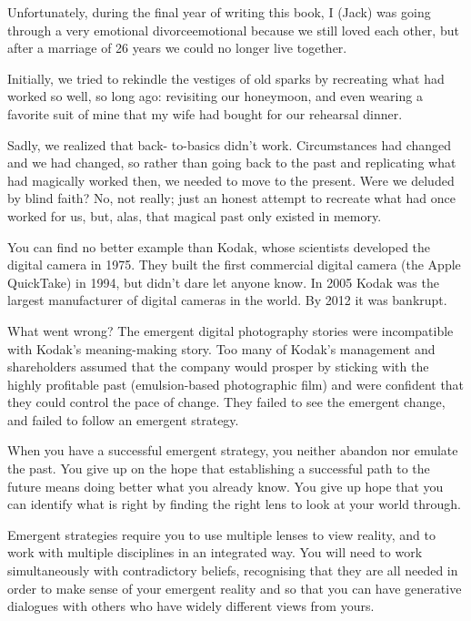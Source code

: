 \begin{longstoryblock}
Unfortunately, during the final year of writing this book, I (Jack) was going through a very emotional divorce\textemdash emotional because we still loved each other, but after a marriage of 26 years we could no longer live together. 


Initially, we tried to rekindle the vestiges of old sparks by recreating what had worked so well, so long ago: revisiting our honeymoon, and even wearing a favorite suit of mine that my wife had bought for our rehearsal dinner. 


Sadly, we realized that back- to-basics didn’t work. Circumstances had changed and we had changed, so rather than going back to the past and replicating what had magically worked then, we needed to move to the present. Were we deluded by blind faith? No, not really; just an honest attempt to recreate what had once worked for us, but, alas, that magical past only existed in memory.


\end{longstoryblock}


You can find no better example than Kodak, whose scientists developed the digital camera in 1975\cite{winger-innovation}. They built the first commercial digital camera (the Apple QuickTake) in 1994, but didn't dare let anyone know. In 2005 Kodak was the largest manufacturer of digital cameras in the world. By 2012 it was bankrupt. 


What went wrong? The emergent digital photography stories were incompatible with Kodak's meaning\hyp{}making story. Too many of Kodak’s management and shareholders assumed that the company would prosper by sticking with the highly profitable past (emulsion-based photographic film) and were confident that they could control the pace of change. They failed to see the emergent change, and failed to follow an emergent strategy.


When you have a successful emergent strategy, you neither abandon nor emulate the past. You give up on the hope that establishing a successful path to the future means doing better what you already know. You give up hope that you can identify what is right by finding the right lens to look at your world through. 


Emergent strategies require you to use multiple lenses to view reality, and to work with multiple disciplines in an integrated way. You will need to work simultaneously with contradictory beliefs, recognising that they are all needed in order to make sense of your emergent reality and so that you can have generative dialogues with others who have widely different views from yours. 


